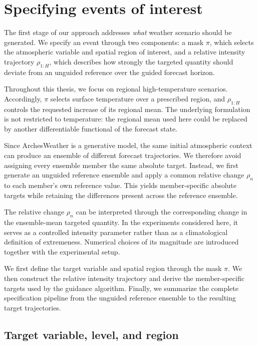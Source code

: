 \chapter{Specifying events of interest}
\label{ch:specify}

The first stage of our approach addresses \emph{what} weather scenario should
be generated. We specify an event through two components: a mask $\pi$, which
selects the atmospheric variable and spatial region of interest, and a relative
intensity trajectory $\rho_{1:H}$, which describes how strongly the targeted
quantity should deviate from an unguided reference over the guided forecast
horizon.

Throughout this thesis, we focus on regional high-temperature scenarios.
Accordingly, $\pi$ selects surface temperature over a prescribed region, and
$\rho_{1:H}$ controls the requested increase of its regional mean. The
underlying formulation is not restricted to temperature: the regional mean
used here could be replaced by another differentiable functional of the
forecast state.

Since ArchesWeather is a generative model, the same initial atmospheric context can
produce an ensemble of different forecast trajectories. We therefore avoid
assigning every ensemble member the same absolute target. Instead, we first
generate an unguided reference ensemble and apply a common relative change
$\rho_n$ to each member's own reference value. This yields member-specific
absolute targets while retaining the differences present across the reference
ensemble.

The relative change $\rho_n$ can be interpreted through the corresponding
change in the ensemble-mean targeted quantity. In the experiments considered
here, it serves as a controlled intensity parameter rather than as a
climatological definition of extremeness. Numerical choices of its magnitude
are introduced together with the experimental setup.

We first define the target variable and spatial region through the mask $\pi$.
We then construct the relative intensity trajectory and derive the
member-specific targets used by the guidance algorithm. Finally, we summarize
the complete specification pipeline from the unguided reference ensemble to
the resulting target trajectories.

\section{Target variable, level, and region}
\label{sec:target-region}

